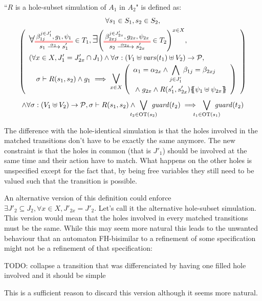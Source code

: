 \documentclass{article}
\begin{document}
\begin{defi}
``\(R\) is a hole-subset simulation of \(A_1\) in \(A_2\)" is defined as:
\begin{multline*}
	\forall s_1 \in S_1, s_2 \in S_2, \\
	\mpar{\renewcommand\arraystretch{1.4}\everymath{\displaystyle}\begin{array}{l}
		\bigsymb{\forall} \OTx{1}{}{1}{1} \in T_1, \bigsymb{\exists} \mpar{\OTx{2}{x}{2x}{2x} \in T_2}^{x \in X}, \\
		\mpar{\forall x \in X, J'_1 = J'_{2x} \cap J_1} \wedge \forall \sigma: \mpar{V_1 \uplus \fvars{t_1} \uplus V_2} \to \values, \\
		\quad \sigma \vdash R\mpar{s_1, s_2} \wedge g_1 \implies \operatorname*{\bigsymb{\bigvee}}_{x \in X} \mpar{\begin{array}{l}
			\alpha_1 = \alpha_{2x} \wedge \bigwedge_{j \in J'_1} \beta_{1j} = \beta_{2xj} \\
			\nwedge g_{2x} \wedge R\mpar{s'_1, s'_{2x}}\psubst{\psi_1 \uplus \psi_{2x}}
		\end{array}} \\
	\end{array}} \\
	\wedge \forall \sigma: \mpar{V_1 \uplus V_2} \to \values, \sigma \vdash R\mpar{s_1, s_2} \wedge \bigvee_\subbox{t_2 \in \fOT{s_2}} \fguard{t_2} \implies \bigvee_\subbox{t_1 \in \fOT{s_1}} \fguard{t_2}
\end{multline*}
\end{defi}
The difference with the hole-identical simulation is that the holes involved in the matched transitions don't have to be exactly the same anymore.
The new constraint is that the holes in common (that is \(J'_1\)) should be involved at the same time and their action have to match.
What happens on the other holes is unspecified except for the fact that, by being free variables they still need to be valued such that the transition is possible.

\begin{exi} %
\end{exi}

An alternative version of this definition could enforce \(\exists J'_2 \subseteq J_2, \forall x \in X, J'_{2x} = J'_2\).
Let's call it the alternative hole-subset simulation.
This version would mean that the holes involved in every matched transitions must be the same.
While this may seem more natural this leads to the unwanted behaviour that an automaton FH-bisimilar to a refinement of some specification might not be a refinement of that specification:
\begin{prop}
TODO: collapse a transition that was differenciated by having one filled hole involved and it should be simple
\end{prop}
This is a sufficient reason to discard this version although it seems more natural.
\begin{prop}
\end{prop}
\end{document}
